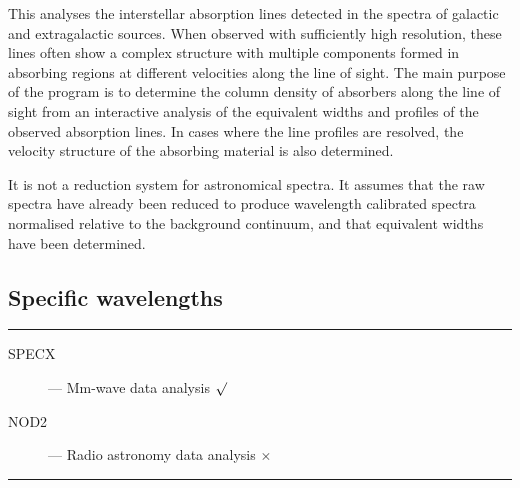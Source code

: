 \begin{description}
This analyses the interstellar absorption lines detected in the spectra
of galactic and extragalactic sources.
When observed with sufficiently high resolution, these lines often show a
complex structure with multiple components formed in absorbing regions at
different velocities along the line of sight.
The main purpose of the program is to determine the column density of absorbers
along the line of sight from an interactive analysis of the equivalent widths
and profiles of the observed absorption lines.
In cases where the line profiles are resolved, the velocity structure of the
absorbing material is also determined.

It is not a reduction system for astronomical spectra.
It assumes that the raw spectra have already been reduced to produce wavelength
calibrated spectra normalised relative to the background continuum, and
that equivalent widths have been determined.

\end{description}

\newpage

\subsection{Specific wavelengths}

\rule{\textwidth}{0.5mm}
\begin{description}
\begin{description}
\item [SPECX] ---  Mm-wave data analysis \hfill $\surd$
\item [NOD2] --- Radio astronomy data analysis \hfill $\times$
\end{description}
\end{description}
\rule{\textwidth}{0.5mm}

